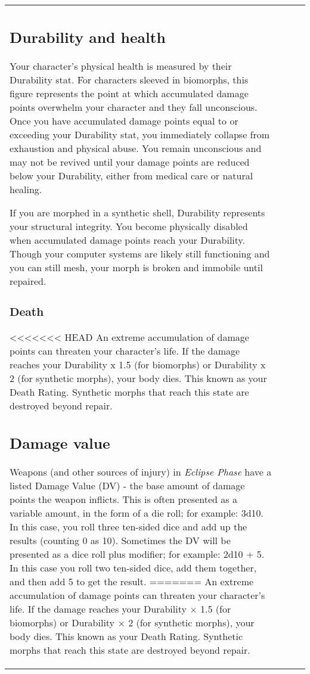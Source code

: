 \begin{table}
\begin{tabular}{|p{8cm}|r|r|r|}
\subsection{Durability and health} \label{sec:durability-health} 

Your character’s physical health is measured by their Durability stat. For characters sleeved in biomorphs, this figure represents the point at which accumulated damage points overwhelm your character and they fall unconscious. Once you have accumulated damage points equal to or exceeding your Durability stat, you immediately collapse from exhaustion and physical abuse. You remain unconscious and may not be revived until your damage points are reduced below your Durability, either from medical care or natural healing. 

If you are morphed in a synthetic shell, Durability represents your structural integrity. You become physically disabled when accumulated damage points reach your Durability. Though your computer systems are likely still functioning and you can still mesh, your morph is broken and immobile until repaired. 



\subsubsection{Death} 

<<<<<<< HEAD An extreme accumulation of damage points can threaten your character’s life. If the damage reaches your Durability x 1.5 (for biomorphs) or Durability x 2 (for synthetic morphs), your body dies. This known as your Death Rating. Synthetic morphs that reach this state are destroyed beyond repair. 

\subsection{Damage value} 

Weapons (and other sources of injury) in \emph{Eclipse Phase} have a listed Damage Value (DV) - the base amount of damage points the weapon inflicts. This is often presented as a variable amount, in the form of a die roll; for example: 3d10. In this case, you roll three ten-sided dice and add up the results (counting 0 as 10). Sometimes the DV will be presented as a dice roll plus modifier; for example: 2d10 + 5. In this case you roll two ten-sided dice, add them together, and then add 5 to get the result. ======= An extreme accumulation of damage points can threaten your character’s life. If the damage reaches your Durability $\times$ 1.5 (for biomorphs) or Durability $\times$ 2 (for synthetic morphs), your body dies. This known as your Death Rating. Synthetic morphs that reach this state are destroyed beyond repair. 


\end{tabular}
\end{table}
